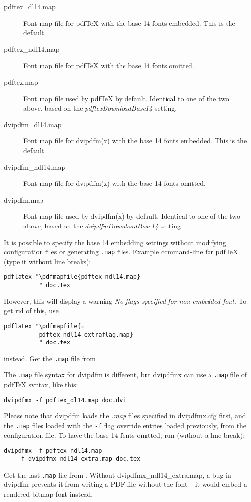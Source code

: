 \documentclass{ltugproc}
\def\cmd{\textsf}
\def\pkg{\textsf}
\newcommand\DD{\discretionary{\the \textfont 1\char"2E}{}{}}
\begin{document}
\begin{description}

\item[pdftex\_dl14.map] Font map file for pdf\TeX{} with the base 14 fonts
  embedded. This is the default.
\item[pdftex\_ndl14.map] Font map file for pdf\TeX{} with the base 14 fonts
  omitted.
\item[pdftex.map] Font map file used by pdf\TeX{} by default.
Identical to one of the two above, based on the
\emph{pdftexDownloadBase14} setting.
\item[dvipdfm\_dl14.map] Font map file for \cmd{dvipdfm(x)} with the base 14
  fonts embedded. This is the default.
\item[dvipdfm\_ndl14.map] Font map file for \cmd{dvipdfm(x)} with the base 14
  fonts omitted.
\item[dvipdfm.map] Font map file used by \cmd{dvipdfm(x)} by default.
Identical to one of the two above, based on the
\emph{dvipdfmDownloadBase14} setting.

\end{description}

It is possible to specify the base 14 embedding settings without modifying
configuration files or generating \texttt{.map} files. Example command-line for
pdf\TeX{} (type it without line breaks):
\begin{verbatim}
pdflatex "\pdfmapfile{pdftex_ndl14.map}
          " doc.tex
\end{verbatim}\noindent
However, this will display a warning \emph{No flags specified for
non-embedded font}. To get rid of this, use
\begin{verbatim}
pdflatex "\pdfmapfile{=
          pdftex_ndl14_extraflag.map}
          " doc.tex
\end{verbatim}\noindent
instead. Get the \texttt{.map} file from \cite{pdfsizeopt-extra}.

The \texttt{.map} file syntax for \cmd{dvipdfm} is different, but
\cmd{dvipdfmx} can use a \texttt{.map} file of pdf\TeX{} syntax, like this:
\begin{verbatim}
dvipdfmx -f pdftex_dl14.map doc.dvi
\end{verbatim}\noindent
Please note that
\cmd{dvipdfm} loads the \emph{.map} files specified in \pkg{dvipdfmx.cfg}
first, and the \texttt{.map} files loaded with the \texttt{-f} flag override
entries loaded previously, from the configuration file. To have the base 14 fonts
omitted, run (without a line break):
\begin{verbatim}
dvipdfmx -f pdftex_ndl14.map 
    -f dvipdfmx_ndl14_extra.map doc.tex
\end{verbatim}\noindent
Get the last \texttt{.map} file from
\cite{pdfsizeopt-extra}. Without \pkg{dvipdfmx\_\DD ndl14\_extra.map}, a bug in
\cmd{dvipdfm} prevents it from writing a PDF file without the font -- it
would embed a rendered bitmap font instead.
\end{document}
